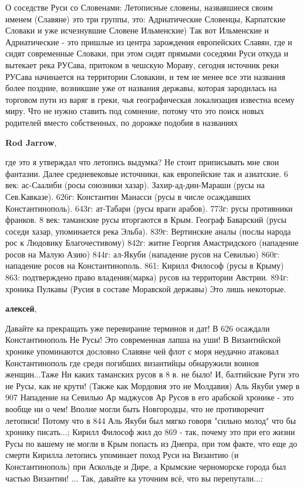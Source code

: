 \begin{itemize}
\begin{itemize}
О соседстве Руси со Словенами: Летописные словены, назвавшиеся своим именем
(Славяне) это три группы, это: Адриатические Словенцы, Карпатские Словаки и уже
исчезнувшие Словене Ильменские) Так вот Ильменские и Адриатические - это
пришлые из центра зарождения европейских Славян, где и сидят современные
Словаки, при этом сидят прямыми соседями Руси откуда и вытекает река РУСава,
притоком в чешскую Мораву, сегодня источник реки РУСава начинается на
территории Словакии, и тем не менее все эти названия более поздние, возникшие
уже от названия державы, которая зародилась на торговом пути из варяг в греки,
чья географическая локализация известна всему миру. Что не нужно ставить под
сомнение, потому что это поиск новых родителей вместо собственных, по дорожке
подобия в названиях

\textbf{Rod Jarrow}, 

где это я утверждал что летопись выдумка? Не стоит приписывать мне свои
фантазии. Далее средневековые источники, как европейские так и азиатские. 6
век: ас-Саалиби (росы союзники хазар). Захир-ад-дин-Мараши (русы на
Сев.Кавказе). 626г: Константин Манасси (русы в числе осаждавших
Константинополь). 643г: ат-Табари (русы враги арабов). 773г: русы противники
франков. 8 век: таманские русы вторгаются в Крым. Географ Баварский (русы
соседи хазар, упоминается река Эльба). 839г: Вертинские аналы (послы народа рос
к Людовику Благочестивому) 842г: житие Георгия Амастридского (нападение росов
на Малую Азию) 844г: ал-Якуби (нападение русов на Севилью) 860г: нападение
росов на Константинополь. 861: Кирилл Философ (русы в Крыму) 863: подтверждено
право владения(марка) русов на территории Австрии. 894г: хроника Пулкавы (Русия
в составе Моравской державы) Это лишь некоторые.

\textbf{алексей}, 

Давайте ка прекращать уже перевирание терминов и дат! В 626 осаждали
Константинополь Не Русы! Это современная лапша на уши! В Византийской хронике
упоминаются дословно Славяне чей флот с моря неудачно атаковал Константинополь
где среди погибших византийцы обнаружили воинов женщин...Таже Ни каких
таманских русов в 8 в. не было! И, балтийские Руги это не Русы, как не крути!
(Также как Мордовия это не Молдавия) Аль Якуби умер в 907 Нападение на Севилью
Ар маджусов Ар Русов в его арабской хронике - это вообще ни о чем! Вполне могли
быть Новгородцы, что не противоречит летописи! Потому что в 844 Аль Якуби был
мягко говоря "сильно молод" что бы хронику писать...; Кирилл Философ жил до 869
- так, почему это при его жизни Русы по вашему не могли в Крым попасть из
Днепра, при том факте, что еще до смерти Кирилла летопись упоминает поход Руси
на Византию (и Константинополь) при Аскольде и Дире, а Крымские черноморске
города был частью Византии! ... Так, давайте ка уточним всё, что вы
перепутали...:


\end{itemize}
\end{itemize}
